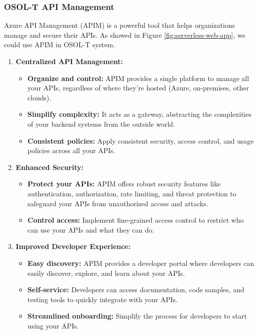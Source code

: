 \documentclass[a4paper,11pt]{article}
\begin{document}
\subsubsection{OSOL-T API Management }
Azure API Management (APIM) is a powerful tool that helps organizations manage and secure their APIs. As showed in Figure \ref{fig:serverless-web-app}, we could use APIM in OSOL-T system.

\begin{enumerate}
	\item \textbf{Centralized API Management:}
	\begin{itemize}
		\item \textbf{Organize and control:} APIM provides a single platform to manage all your APIs, regardless of where they're hosted (Azure, on-premises, other clouds).
		\item \textbf{Simplify complexity:} It acts as a gateway, abstracting the complexities of your backend systems from the outside world.
		\item \textbf{Consistent policies:} Apply consistent security, access control, and usage policies across all your APIs.
	\end{itemize}
	
	\item \textbf{Enhanced Security:}
	\begin{itemize}
		\item \textbf{Protect your APIs:} APIM offers robust security features like authentication, authorization, rate limiting, and threat protection to safeguard your APIs from unauthorized access and attacks.
		\item \textbf{Control access:} Implement fine-grained access control to restrict who can use your APIs and what they can do.
	\end{itemize}
	
	\item \textbf{Improved Developer Experience:}
	\begin{itemize}
		\item \textbf{Easy discovery:} APIM provides a developer portal where developers can easily discover, explore, and learn about your APIs.
		\item \textbf{Self-service:} Developers can access documentation, code samples, and testing tools to quickly integrate with your APIs.
		\item \textbf{Streamlined onboarding:} Simplify the process for developers to start using your APIs.
	\end{itemize}
	

\end{enumerate}
\end{document}
